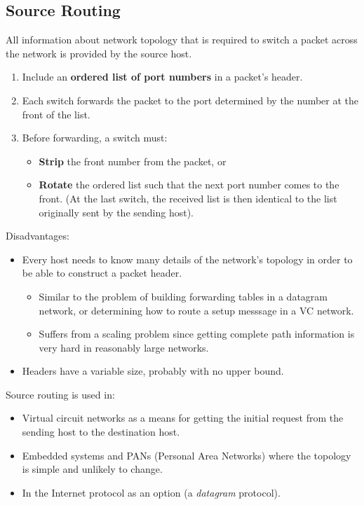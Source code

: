 \documentclass[11pt]{article}
\begin{document}
\subsection{Source Routing}
\label{sec:org1cb87b4}
All information about network topology that is required to switch a packet across the network is provided by the source host.
\begin{enumerate}
\item Include an \textbf{ordered list of port numbers} in a packet's header.
\item Each switch forwards the packet to the port determined by the number at the front of the list.
\item Before forwarding, a switch must:
\begin{itemize}
\item \textbf{Strip} the front number from the packet, or
\item \textbf{Rotate} the ordered list such that the next port number comes to the front. (At the last switch, the received list is then identical to the list originally sent by the sending host).
\end{itemize}
\end{enumerate}
Disadvantages:
\begin{itemize}
\item Every host needs to know many details of the network's topology in order to be able to construct a packet header.
\begin{itemize}
\item Similar to the problem of building forwarding tables in a datagram network, or determining how to route a setup messsage in a VC network.
\item Suffers from a scaling problem since getting complete path information is very hard in reasonably large networks.
\end{itemize}
\item Headers have a variable size, probably with no upper bound.
\end{itemize}
Source routing is used in:
\begin{itemize}
\item Virtual circuit networks as a means for getting the initial request from the sending host to the destination host.
\item Embedded systems and PANs (Personal Area Networks) where the topology is simple and unlikely to change.
\item In the Internet protocol as an option (a \emph{datagram} protocol).
\end{itemize}
\end{document}
